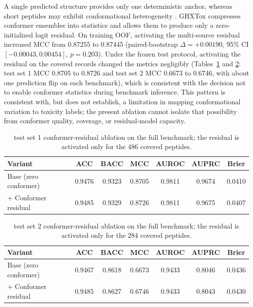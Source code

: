 \documentclass[12pt]{article}
\newcommand{\ghxheader}{}
\newcommand{\ghxhighlight}{}
\begin{document}
A single predicted structure provides only one deterministic anchor, whereas
short peptides may exhibit conformational heterogeneity
\cite{abdin2024pepflow}. GHXTox compresses
conformer ensembles into statistics and allows them to produce only a
zero-initialized logit residual. On training OOF, activating the
multi-source residual increased MCC from 0.87255 to 0.87445 (paired-bootstrap
$\Delta = +0.00190$, 95\% CI $[-0.00043, 0.00454]$, $p = 0.203$). Under the
frozen test protocol, activating the residual on the covered records changed
the metrics negligibly (Tables~\ref{tab:conformer_ablation_test1} and
\ref{tab:conformer_ablation_test2}: test set 1 MCC 0.8705 to 0.8726 and test set 2 MCC
0.6673 to 0.6746, with about one prediction flip on each benchmark), which is
consistent with the decision not to enable conformer statistics during
benchmark inference. This pattern is consistent with, but does not establish,
a limitation in mapping conformational variation to toxicity labels; the
present ablation cannot isolate that possibility from conformer quality,
coverage, or residual-model capacity.

\begin{table}[htbp]
    \centering
    \caption{test set 1 conformer-residual ablation on the full benchmark; the residual
    is activated only for the 486 covered peptides.}
    \label{tab:conformer_ablation_test1}
    \begin{tabular}{lcccccc}
        \toprule
        \ghxheader Variant & ACC & BACC & MCC & AUROC & AUPRC & Brier \\
        \midrule
        Base (zero conformer) & 0.9476 & 0.9323 & 0.8705 & 0.9811 & 0.9674 & 0.0410 \\
        \ghxhighlight + Conformer residual & 0.9485 & 0.9329 & 0.8726 & 0.9811 & 0.9675 & 0.0407 \\
        \bottomrule
    \end{tabular}
\end{table}

\begin{table}[htbp]
    \centering
    \caption{test set 2 conformer-residual ablation on the full benchmark; the residual
    is activated only for the 284 covered peptides.}
    \label{tab:conformer_ablation_test2}
    \begin{tabular}{lcccccc}
        \toprule
        \ghxheader Variant & ACC & BACC & MCC & AUROC & AUPRC & Brier \\
        \midrule
        Base (zero conformer) & 0.9467 & 0.8618 & 0.6673 & 0.9433 & 0.8046 & 0.0436 \\
        \ghxhighlight + Conformer residual & 0.9485 & 0.8627 & 0.6746 & 0.9433 & 0.8043 & 0.0430 \\
        \bottomrule
    \end{tabular}
\end{table}
\end{document}
